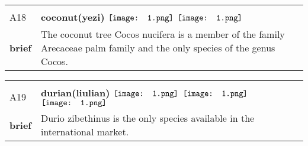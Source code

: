 \documentclass[UTF8]{article}
\begin{document}
            \begin{tabularx}{\textwidth}{p{1.5cm}X}
            \arrayrulecolor{myBlue}
        	\hline\\
            \small{A18}&
            \large{\bfseries{coconut(yezi)}}\hfill
                                                            \phantom{$\vcenter{\hbox{\texttt{[image: 1.png]}}}$}
                                                                \phantom{$\vcenter{\hbox{\texttt{[image: 1.png]}}}$}
                                                                $\vcenter{\hbox{\texttt{[image: 1.png]}}}$
                                                                \phantom{$\vcenter{\hbox{\texttt{[image: 1.png]}}}$}
                                                                \phantom{$\vcenter{\hbox{\texttt{[image: 1.png]}}}$}
                                                                $\vcenter{\hbox{\texttt{[image: 1.png]}}}$
                                                                \phantom{$\vcenter{\hbox{\texttt{[image: 1.png]}}}$}
                                        \\[10pt]
            \large{\bfseries{brief}}&\noindent\parbox[c]{\hsize}{The coconut tree Cocos nucifera is a member of the family Arecaceae palm family and the only species of the genus Cocos.} \\[5pt]
            \hline\\[-10pt]
        \end{tabularx}
            \begin{tabularx}{\textwidth}{p{1.5cm}X}
            \arrayrulecolor{myBlue}
        	\hline\\
            \small{A19}&
            \large{\bfseries{durian(liulian)}}\hfill
                                                            $\vcenter{\hbox{\texttt{[image: 1.png]}}}$
                                                                \phantom{$\vcenter{\hbox{\texttt{[image: 1.png]}}}$}
                                                                $\vcenter{\hbox{\texttt{[image: 1.png]}}}$
                                                                \phantom{$\vcenter{\hbox{\texttt{[image: 1.png]}}}$}
                                                                \phantom{$\vcenter{\hbox{\texttt{[image: 1.png]}}}$}
                                                                $\vcenter{\hbox{\texttt{[image: 1.png]}}}$
                                                                \phantom{$\vcenter{\hbox{\texttt{[image: 1.png]}}}$}
                                        \\[10pt]
            \large{\bfseries{brief}}&\noindent\parbox[c]{\hsize}{Durio zibethinus is the only species available in the international market.} \\[5pt]
            \hline\\[-10pt]
        \end{tabularx}
\end{document}
